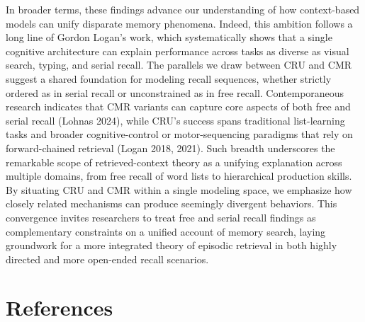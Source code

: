 \documentclass[
  letterpaper,
  DIV=11,
  numbers=noendperiod]{scrartcl}
\begin{document}
In broader terms, these findings advance our understanding of how
context-based models can unify disparate memory phenomena. Indeed, this
ambition follows a long line of Gordon Logan's work, which
systematically shows that a single cognitive architecture can explain
performance across tasks as diverse as visual search, typing, and serial
recall. The parallels we draw between CRU and CMR suggest a shared
foundation for modeling recall sequences, whether strictly ordered as in
serial recall or unconstrained as in free recall. Contemporaneous
research indicates that CMR variants can capture core aspects of both
free and serial recall (Lohnas 2024), while CRU's success spans
traditional list-learning tasks and broader cognitive-control or
motor-sequencing paradigms that rely on forward-chained retrieval (Logan
2018, 2021). Such breadth underscores the remarkable scope of
retrieved-context theory as a unifying explanation across multiple
domains, from free recall of word lists to hierarchical production
skills. By situating CRU and CMR within a single modeling space, we
emphasize how closely related mechanisms can produce seemingly divergent
behaviors. This convergence invites researchers to treat free and serial
recall findings as complementary constraints on a unified account of
memory search, laying groundwork for a more integrated theory of
episodic retrieval in both highly directed and more open-ended recall
scenarios.

\section{References}\label{references}

\label{refs}
\end{document}

